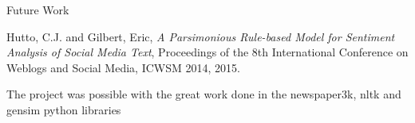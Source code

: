 \documentclass[final]{beamer}
\newlength{\twocolwid}
\begin{document}
\begin{frame}[t]
\begin{columns}[t]
\begin{column}{\twocolwid}
\begin{block}{Future Work {}}
\end{block}



\begin{block}{ {}}
    \begin{thebibliography}

          Hutto, C.J. and Gilbert, Eric,
          \emph{ A Parsimonious Rule-based Model for Sentiment Analysis of Social Media Text},
          Proceedings of the 8th International Conference on Weblogs and Social Media, ICWSM 2014,
          2015.
    \end{thebibliography}
    \vspace{8mm}
    The project was possible with the great work done in the newspaper3k, nltk and gensim python libraries

    \small{} \\
    
    \end{block}


\end{column} %

\end{columns} %

\end{frame} %
\end{document}
